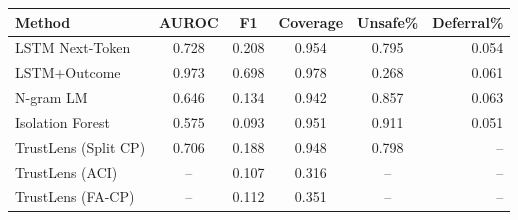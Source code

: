 \begin{tabular}{lccccr}
\toprule
Method & AUROC & F1 & Coverage & Unsafe\% & Deferral\% \\
\midrule
LSTM Next-Token & 0.728 & 0.208 & 0.954 & 0.795 & 0.054 \\
LSTM+Outcome & 0.973 & 0.698 & 0.978 & 0.268 & 0.061 \\
N-gram LM & 0.646 & 0.134 & 0.942 & 0.857 & 0.063 \\
Isolation Forest & 0.575 & 0.093 & 0.951 & 0.911 & 0.051 \\
\midrule
TrustLens (Split CP) & 0.706 & 0.188 & 0.948 & 0.798 & -- \\
TrustLens (ACI) & -- & 0.107 & 0.316 & -- & -- \\
TrustLens (FA-CP) & -- & 0.112 & 0.351 & -- & -- \\
\bottomrule
\end{tabular}